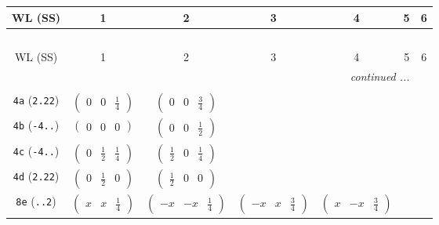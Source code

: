 \documentclass[fleqn,9pt,landscape]{jsarticle}
\begin{document}
\begin{center}
\renewcommand{\arraystretch}{1.2}
\begin{longtable}{ccccccc}
 \hline \hline
WL (SS) & 1 & 2 & 3 & 4 & 5 & 6 \\ \hline \endfirsthead

\multicolumn{6}{l}{\tablename\ \thetable{}} \\
 \hline \hline
WL (SS) & 1 & 2 & 3 & 4 & 5 & 6 \\ \hline \endhead

 \hline \hline
\multicolumn{6}{r}{\footnotesize\it continued ...} \\ \endfoot

 \hline \hline
\multicolumn{6}{r}{} \\ \endlastfoot

{\tt 4a} ({\tt 2.22}) & $ \begin{pmatrix} 0 & 0 & \frac{1}{4} \end{pmatrix} $ & $ \begin{pmatrix} 0 & 0 & \frac{3}{4} \end{pmatrix} $ & $  $ & $  $ & $  $ & $  $ \\ \hline
{\tt 4b} ({\tt -4..}) & $ \begin{pmatrix} 0 & 0 & 0 \end{pmatrix} $ & $ \begin{pmatrix} 0 & 0 & \frac{1}{2} \end{pmatrix} $ & $  $ & $  $ & $  $ & $  $ \\ \hline
{\tt 4c} ({\tt -4..}) & $ \begin{pmatrix} 0 & \frac{1}{2} & \frac{1}{4} \end{pmatrix} $ & $ \begin{pmatrix} \frac{1}{2} & 0 & \frac{1}{4} \end{pmatrix} $ & $  $ & $  $ & $  $ & $  $ \\ \hline
{\tt 4d} ({\tt 2.22}) & $ \begin{pmatrix} 0 & \frac{1}{2} & 0 \end{pmatrix} $ & $ \begin{pmatrix} \frac{1}{2} & 0 & 0 \end{pmatrix} $ & $  $ & $  $ & $  $ & $  $ \\ \hline
{\tt 8e} ({\tt ..2}) & $ \begin{pmatrix} x & x & \frac{1}{4} \end{pmatrix} $ & $ \begin{pmatrix} - x & - x & \frac{1}{4} \end{pmatrix} $ & $ \begin{pmatrix} - x & x & \frac{3}{4} \end{pmatrix} $ & $ \begin{pmatrix} x & - x & \frac{3}{4} \end{pmatrix} $ & $  $ & $  $ \\ \hline

\end{longtable}
\end{center}
\end{document}
